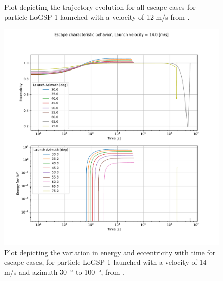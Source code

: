 \documentclass[print]{tudelft-report}
\begin{document}
\begin{appendices}
\begin{figure}[htb]
    \caption{Plot depicting the trajectory evolution for all escape cases for particle LoGSP-1 launched with a velocity of 12 m/s from \protect{}.}
    \label{fig:leadingEdge_logsp1_escape_traj_12ms_solar225}
    \end{figure}
    \FloatBarrier
    \begin{figure}[htb]
    \centering
    \captionsetup{justification=centering}
    \includegraphics[width=\textwidth, height=0.6\textheight, keepaspectratio=true]{Results/Images/leading_edge_perturbations/logsp1_escape_energy_ecc_14ms_solarPhase225.pdf}
    \caption{Plot depicting the variation in energy and eccentricity with time for escape cases, for particle LoGSP-1 launched with a velocity of 14 m/s and azimuth \SI{30}{\degree} to \SI{100}{\degree}, from \protect{}.}
    \label{fig:leadingEdge_logsp1_escape_energy_ecc_14ms_solar225}
    \end{figure}
    \FloatBarrier
    \begin{figure}[htb]
    \centering
    \captionsetup{justification=centering}

\end{figure}
\end{appendices}
\end{document}
